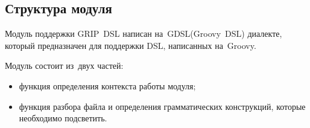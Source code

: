 \subsection{Структура модуля} \label{sub241}

Модуль поддержки GRIP~DSL написан на~GDSL(Groovy~DSL) диалекте, который предназначен для поддержки DSL, написанных на~Groovy. 

Модуль состоит из~двух частей:

\begin{itemize}
\item{функция определения контекста работы модуля;}
\item{функция разбора файла и определения грамматических конструкций, которые необходимо подсветить.}
\end{itemize} 